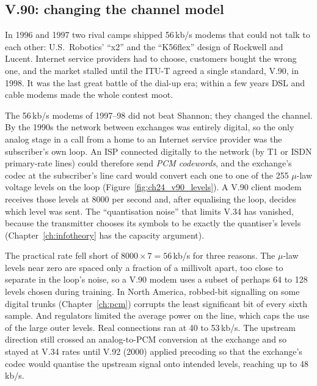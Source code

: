 \subsection{V.90: changing the channel model}


\begin{history}
In 1996 and 1997 two rival camps shipped 56\,kb/s modems that could not talk to each other:
U.S.~Robotics' ``x2'' and the ``K56flex'' design of Rockwell and Lucent. Internet service providers
had to choose, customers bought the wrong one, and the market stalled until the ITU-T agreed a single
standard, V.90, in 1998. It was the last great battle of the dial-up era; within a few years DSL
and cable modems made the whole contest moot.
\end{history}

The 56\,kb/s modems of 1997--98 did not beat Shannon; they changed the channel. By the 1990s the
network between exchanges was entirely digital, so the only analog stage in a call from a home to
an Internet service provider was the subscriber's own loop. An ISP connected digitally to the
network (by T1 or ISDN primary-rate lines) could therefore send \emph{PCM codewords}, and the
exchange's codec at the subscriber's line card would convert each one to one of the 255 $\mu$-law
voltage levels on the loop (Figure~\ref{fig:ch24_v90_levels}). A V.90 client modem receives those
levels at 8000 per second and, after equalising the loop, decides which level was sent. The
``quantisation noise'' that limits V.34 has vanished, because the transmitter chooses its symbols
to be exactly the quantiser's levels (Chapter~\ref{ch:infotheory} has the capacity argument).



The practical rate fell short of $8000\times7=56$\,kb/s for three reasons. The $\mu$-law levels near
zero are spaced only a fraction of a millivolt apart, too close to separate in the loop's noise,
so a V.90 modem uses a subset of perhaps 64 to 128 levels chosen during training. In North America,
robbed-bit signalling on some digital trunks (Chapter~\ref{ch:pcm}) corrupts the least significant
bit of every sixth sample. And regulators limited the average power on the line, which caps the use
of the large outer levels. Real connections ran at 40 to 53\,kb/s. The upstream direction still
crossed an analog-to-PCM conversion at the exchange and so stayed at V.34 rates until V.92 (2000)
applied precoding so that the exchange's codec would quantise the upstream signal onto intended
levels, reaching up to 48\,kb/s.

